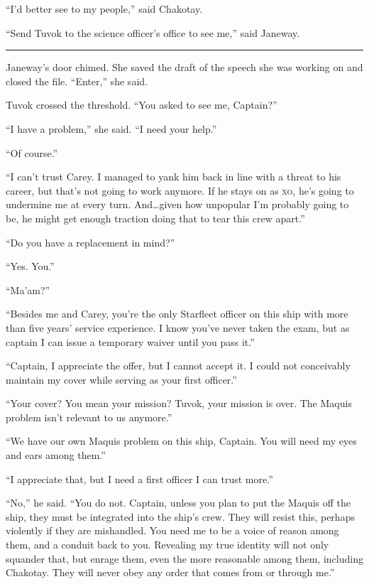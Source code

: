 \documentclass[twoside,letterpaper,12pt]{memoir}
\begin{document}
``I’d better see to my people,'' said Chakotay. 

``Send Tuvok to the science officer’s office to see me,'' said Janeway. 

\fancybreak{\rule{3cm}{0.4 pt}} 

Janeway’s door chimed. She saved the draft of the speech she was working on and closed the file. ``Enter,'' she said. 

Tuvok crossed the threshold. ``You asked to see me, Captain?'' 

``I have a problem,'' she said. ``I need your help.'' 

``Of course.'' 

``I can’t trust Carey. I managed to yank him back in line with a threat to his career, but that’s not going to work anymore. If he stays on as \textsc{xo}, he’s going to undermine me at every turn. And\ldots given how unpopular I’m probably going to be, he might get enough traction doing that to tear this crew apart.'' 

``Do you have a replacement in mind?'' 

``Yes. You.'' 

``Ma’am?'' 

``Besides me and Carey, you’re the only Starfleet officer on this ship with more than five years’ service experience. I know you’ve never taken the exam, but as captain I can issue a temporary waiver until you pass it.'' 

``Captain, I appreciate the offer, but I cannot accept it. I could not conceivably maintain my cover while serving as your first officer.'' 

``Your cover? You mean your mission? Tuvok, your mission is over. The Maquis problem isn’t relevant to us anymore.'' 

``We have our own Maquis problem on this ship, Captain. You will need my eyes and ears among them.'' 

``I appreciate that, but I need a first officer I can trust more.'' 

``No,'' he said. ``You do not. Captain, unless you plan to put the Maquis off the ship, they must be integrated into the ship’s crew. They will resist this, perhaps violently if they are mishandled. You need me to be a voice of reason among them, and a conduit back to you. Revealing my true identity will not only squander that, but enrage them, even the more reasonable among them, including Chakotay. They will never obey any order that comes from or through me.'' 
\end{document}
